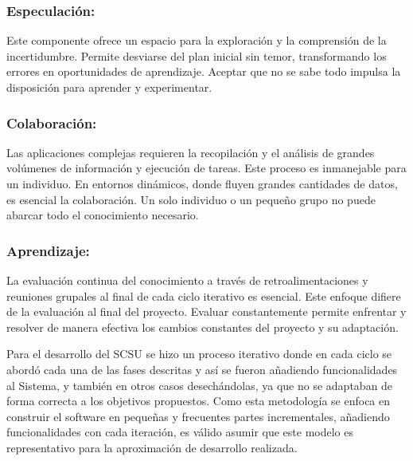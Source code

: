 \documentclass[
  10,
  openany]{book}
\begin{document}
\hypertarget{especulaciuxf3n}{%
\subsubsection{\texorpdfstring{\textbf{Especulación:}}{Especulación:}}\label{especulaciuxf3n}}

Este componente ofrece un espacio para la exploración y la comprensión de la incertidumbre. Permite desviarse del plan inicial sin temor, transformando los errores en oportunidades de aprendizaje. Aceptar que no se sabe todo impulsa la disposición para aprender y experimentar.

\hypertarget{colaboraciuxf3n}{%
\subsubsection{\texorpdfstring{\textbf{Colaboración:}}{Colaboración:}}\label{colaboraciuxf3n}}

Las aplicaciones complejas requieren la recopilación y el análisis de grandes volúmenes de información y ejecución de tareas. Este proceso es inmanejable para un individuo. En entornos dinámicos, donde fluyen grandes cantidades de datos, es esencial la colaboración. Un solo individuo o un pequeño grupo no puede abarcar todo el conocimiento necesario.

\hypertarget{aprendizaje}{%
\subsubsection{\texorpdfstring{\textbf{Aprendizaje:}}{Aprendizaje:}}\label{aprendizaje}}

La evaluación continua del conocimiento a través de retroalimentaciones y reuniones grupales al final de cada ciclo iterativo es esencial. Este enfoque difiere de la evaluación al final del proyecto. Evaluar constantemente permite enfrentar y resolver de manera efectiva los cambios constantes del proyecto y su adaptación.

Para el desarrollo del SCSU se hizo un proceso iterativo donde en cada ciclo se abordó cada una de las fases descritas y así se fueron añadiendo funcionalidades al Sistema, y también en otros casos desechándolas, ya que no se adaptaban de forma correcta a los objetivos propuestos. Como esta metodología se enfoca en construir el software en pequeñas y frecuentes partes incrementales, añadiendo funcionalidades con cada iteración, es válido asumir que este modelo es representativo para la aproximación de desarrollo realizada.
\end{document}
